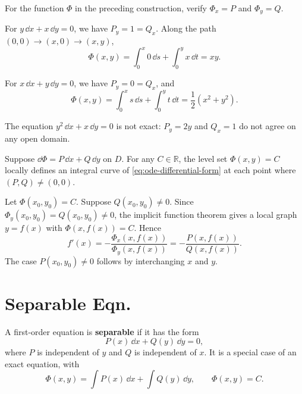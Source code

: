 \begin{exerciseenv}
For the function $\Phi$ in the preceding construction, verify
$\Phi_x=P$ and $\Phi_y=Q$.
\end{exerciseenv}

\begin{exampleenv}
For $y\,\dd x+x\,\dd y=0$, we have $P_y=1=Q_x$.
Along the path $(0,0)\to(x,0)\to(x,y)$,
\[
    \Phi(x,y)=\int_0^x0\,\dd s+\int_0^y x\,\dd t=xy.
\]
\end{exampleenv}

\begin{exampleenv}
For $x\,\dd x+y\,\dd y=0$, we have $P_y=0=Q_x$, and
\[
    \Phi(x,y)=\int_0^x s\,\dd s+\int_0^y t\,\dd t
             =\frac12(x^2+y^2).
\]
\end{exampleenv}

\begin{exampleenv}
The equation $y^2\,\dd x+x\,\dd y=0$ is not exact:
$P_y=2y$ and $Q_x=1$ do not agree on any open domain.
\end{exampleenv}

\begin{theoremenv}\label{thm:ode-potential-curves}
Suppose $\dd\Phi=P\,\dd x+Q\,\dd y$ on $D$.
For any $C\in\mathbb R$, the level set $\Phi(x,y)=C$ locally defines
an integral curve of \eqref{eq:ode-differential-form} at each point
where $(P,Q)\ne(0,0)$.
\end{theoremenv}

\begin{proofenv}
Let $\Phi(x_0,y_0)=C$. Suppose $Q(x_0,y_0)\ne0$.
Since $\Phi_y(x_0,y_0)=Q(x_0,y_0)\ne0$, the implicit function theorem
gives a local graph $y=f(x)$ with $\Phi(x,f(x))=C$. Hence
\[
    f'(x)=-\frac{\Phi_x(x,f(x))}{\Phi_y(x,f(x))}
          =-\frac{P(x,f(x))}{Q(x,f(x))}.
\]
The case $P(x_0,y_0)\ne0$ follows by interchanging $x$ and $y$.
\end{proofenv}

\section{Separable Eqn.}

\begin{definitionenv}
A first-order equation is \textbf{separable} if it has the form
\[
    P(x)\,\dd x+Q(y)\,\dd y=0,
\]
where $P$ is independent of $y$ and $Q$ is independent of $x$.
It is a special case of an exact equation, with
\[
    \Phi(x,y)=\int P(x)\,\dd x+\int Q(y)\,\dd y,
    \qquad \Phi(x,y)=C.
\]
\end{definitionenv}

